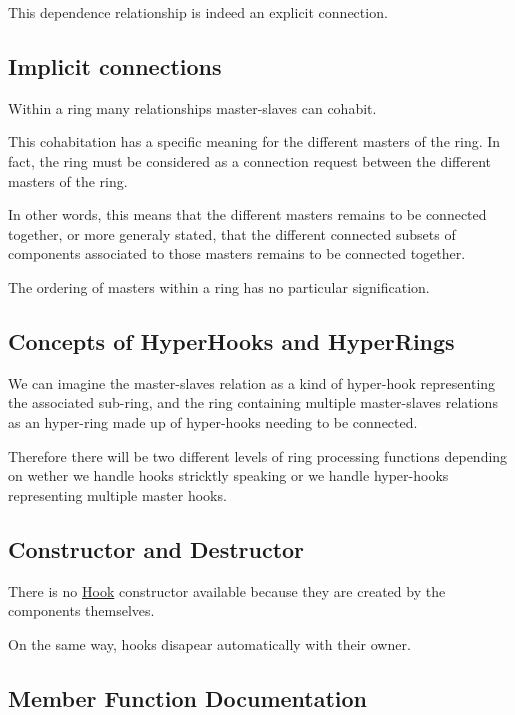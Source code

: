 This dependence relationship is indeed an explicit connection.\hypertarget{classHurricane_1_1Hook_secHookImplicitConnections}{}\subsection{Implicit connections}\label{classHurricane_1_1Hook_secHookImplicitConnections}
Within a ring many relationships master-\/slaves can cohabit.

This cohabitation has a specific meaning for the different masters of the ring. In fact, the ring must be considered as a connection request between the different masters of the ring.

In other words, this means that the different masters remains to be connected together, or more generaly stated, that the different connected subsets of components associated to those masters remains to be connected together.

The ordering of masters within a ring has no particular signification.\hypertarget{classHurricane_1_1Hook_secHookConceptsOfHyperhooksAndHyperrings}{}\subsection{Concepts of Hyper\+Hooks and Hyper\+Rings}\label{classHurricane_1_1Hook_secHookConceptsOfHyperhooksAndHyperrings}
We can imagine the master-\/slaves relation as a kind of hyper-\/hook representing the associated sub-\/ring, and the ring containing multiple master-\/slaves relations as an hyper-\/ring made up of hyper-\/hooks needing to be connected.

Therefore there will be two different levels of ring processing functions depending on wether we handle hooks stricktly speaking or we handle hyper-\/hooks representing multiple master hooks.\hypertarget{classHurricane_1_1Hook_secHookConstructorAndDestructor}{}\subsection{Constructor and Destructor}\label{classHurricane_1_1Hook_secHookConstructorAndDestructor}
There is no \hyperlink{classHurricane_1_1Hook}{Hook} constructor available because they are created by the components themselves.

On the same way, hooks disapear automatically with their owner. 

\subsection{Member Function Documentation}
\mbox{\label{classHurricane_1_1Hook_ab420305aa59b8ff10d59678363de2511}} 
